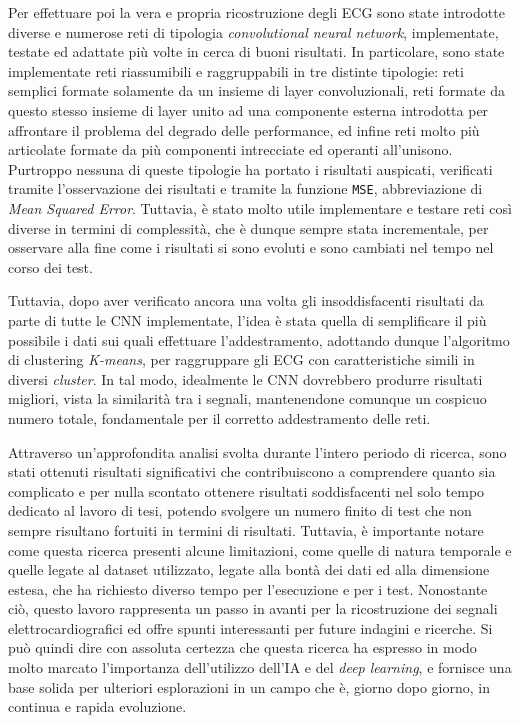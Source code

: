\documentclass[12pt,italian]{report}
\newcommand\blankpage{
    \null
    \thispagestyle{empty}
    \addtocounter{page}{-1}
    \newpage}
\begin{document}
Per effettuare poi la vera e propria ricostruzione degli ECG sono state introdotte diverse e numerose reti di tipologia \textit{convolutional neural network}, implementate, testate ed adattate più volte in cerca di buoni risultati. In particolare, sono state implementate reti riassumibili e raggruppabili in tre distinte tipologie: reti semplici formate solamente da un insieme di layer convoluzionali, reti formate da questo stesso insieme di layer unito ad una componente esterna introdotta per affrontare il problema del degrado delle performance, ed infine reti molto più articolate formate da più componenti intrecciate ed operanti all'unisono. Purtroppo nessuna di queste tipologie ha portato i risultati auspicati, verificati tramite l'osservazione dei risultati e tramite la funzione \texttt{MSE}, abbreviazione di \textit{Mean Squared Error}. Tuttavia, è stato molto utile implementare e testare reti così diverse in termini di complessità, che è dunque sempre stata incrementale, per osservare alla fine come i risultati si sono evoluti e sono cambiati nel tempo nel corso dei test.

Tuttavia, dopo aver verificato ancora una volta gli insoddisfacenti risultati da parte di tutte le CNN implementate, l'idea è stata quella di semplificare il più possibile i dati sui quali effettuare l'addestramento, adottando dunque l'algoritmo di clustering \textit{K-means}, per raggruppare gli ECG con caratteristiche simili in diversi \textit{cluster}. In tal modo, idealmente le CNN dovrebbero produrre risultati migliori, vista la similarità tra i segnali, mantenendone comunque un cospicuo numero totale, fondamentale per il corretto addestramento delle reti.

Attraverso un'approfondita analisi svolta durante l'intero periodo di ricerca, sono stati ottenuti risultati significativi che contribuiscono a comprendere quanto sia complicato e per nulla scontato ottenere risultati soddisfacenti nel solo tempo dedicato al lavoro di tesi, potendo svolgere un numero finito di test che non sempre risultano fortuiti in termini di risultati. Tuttavia, è importante notare come questa ricerca presenti alcune limitazioni, come quelle di natura temporale e quelle legate al dataset utilizzato, legate alla bontà dei dati ed alla dimensione estesa, che ha richiesto diverso tempo per l'esecuzione e per i test. Nonostante ciò, questo lavoro rappresenta un passo in avanti per la ricostruzione dei segnali elettrocardiografici ed offre spunti interessanti per future indagini e ricerche. Si può quindi dire con assoluta certezza che questa ricerca ha espresso in modo molto marcato l'importanza dell'utilizzo dell'IA e del \textit{deep learning}, e fornisce una base solida per ulteriori esplorazioni in un campo che è, giorno dopo giorno, in continua e rapida evoluzione.

\afterpage{\blankpage}




\afterpage{\blankpage}
\end{document}
